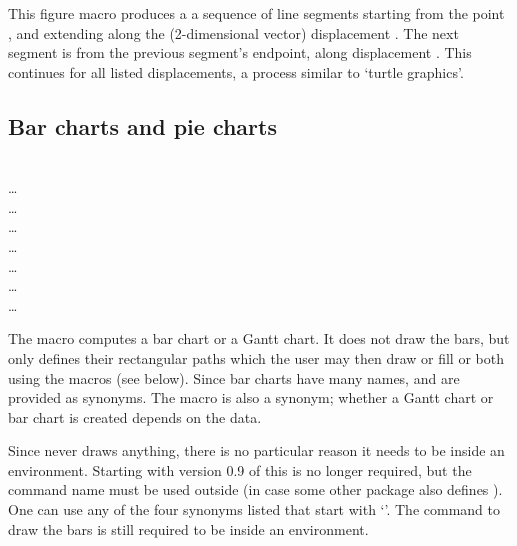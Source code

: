 \documentclass[letterpaper]{article}
\begin{document}
\begin{cd}
%
%
\end{cd}

This figure macro produces a a sequence of line segments starting from
the point , and extending along the (2-dimen\-sional vector)
displacement . The next segment is from the previous
segment's endpoint, along displacement . This continues for
all listed displacements, a process similar to `turtle graphics'.


\subsection{Bar charts and pie charts}\label{charts}

\begin{cd}
%
  \\
\dots\\
\dots\\
\dots\\
\dots\\
\dots\\
\dots\\
\dots
{}%
%
%
%
\end{cd}

The macro  computes a bar chart or a Gantt chart. It does
not draw the bars, but only defines their rectangular paths which the
user may then draw or fill or both using the  macros (see
below). Since bar charts have many names,  and
 are provided as synonyms. The macro  is also a
synonym; whether a Gantt chart or bar chart is created depends on the
data.

Since  never draws anything, there is no particular reason
it needs to be inside an  environment. Starting with version
0.9 of \mfp{} this is no longer required, but the command name
 must be used outside (in case some other package also
defines ). One can use any of the four synonyms listed that
start with `'. The command to draw the bars is still required to
be inside an  environment.
\end{document}
